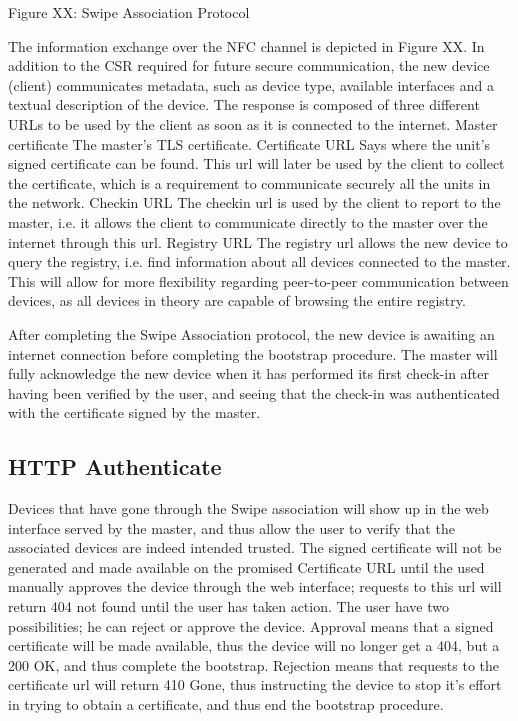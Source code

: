 Figure XX: Swipe Association Protocol

The information exchange over the NFC channel is depicted in Figure XX. In addition to the CSR required for future secure communication, the new device (client) communicates metadata, such as device type, available interfaces and a textual description of the device. The response is composed of three different URLs to be used by the client as soon as it is connected to the internet.
Master certificate    The master’s TLS certificate.
Certificate URL    Says where the unit’s signed certificate can be found. This url will later be used by the client to collect the certificate, which is a requirement to communicate securely all the units in the network.
Checkin URL        The checkin url is used by the client to report to the master, i.e. it allows the client to communicate directly to the master over the internet through this url.
Registry URL        The registry url allows the new device to query the registry, i.e. find information about all devices connected to the master. This will allow for more flexibility regarding peer-to-peer communication between devices, as all devices in theory are capable of browsing the entire registry.

After completing the Swipe Association protocol, the new device is awaiting an internet connection before completing the bootstrap procedure. The master will fully acknowledge the new device when it has performed its first check-in after having been verified by the user, and seeing that the check-in was authenticated with the certificate signed by the master.

\subsection{HTTP Authenticate}
Devices that have gone through the Swipe association will show up in the web interface served by the master, and thus allow the user to verify that the associated devices are indeed intended trusted. The signed certificate will not be generated and made available on the promised Certificate URL until the used manually approves the device through the web interface; requests to this url will return 404 not found until the user has taken action.
The user have two possibilities; he can reject or approve the device. Approval means that a signed certificate will be made available, thus the device will no longer get a 404, but a 200 OK, and thus complete the bootstrap. Rejection means that requests to the certificate url will return 410 Gone, thus instructing the device to stop it’s effort in trying to obtain a certificate, and thus end the bootstrap procedure.

